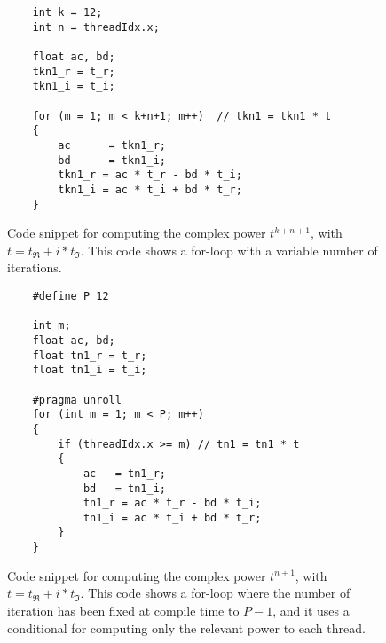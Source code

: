\medskip

\begin{figure*}\begin{center}
	\begin{lstlisting}
	int k = 12;
	int n = threadIdx.x;
	    
	float ac, bd;
	tkn1_r = t_r;
	tkn1_i = t_i;
	    
	for (m = 1; m < k+n+1; m++)  // tkn1 = tkn1 * t
	{
	    ac      = tkn1_r;
	    bd      = tkn1_i;
	    tkn1_r = ac * t_r - bd * t_i;
	    tkn1_i = ac * t_i + bd * t_r;
	}

	\end{lstlisting}
\caption{Code snippet for computing the complex power $t^{k+n+1}$, with $t = t_\Re + i * t_\Im$. This code shows a for-loop with a variable number of iterations.}
\label{code:loop_divergence}
\end{center}
\end{figure*}


\begin{figure*}\begin{center}
	\begin{lstlisting}
	#define P 12
	
	int m;
	float ac, bd;
	float tn1_r = t_r;
	float tn1_i = t_i;
	
	#pragma unroll
	for (int m = 1; m < P; m++)
	{
	    if (threadIdx.x >= m) // tn1 = tn1 * t
	    {
	        ac   = tn1_r;
	        bd   = tn1_i;
	        tn1_r = ac * t_r - bd * t_i;
	        tn1_i = ac * t_i + bd * t_r;
	    }
	}

	\end{lstlisting}
\caption{Code snippet for computing the complex power $t^{n+1}$, with $t = t_\Re + i * t_\Im$. This code shows a for-loop where the number of iteration has been fixed at compile time to $P-1$, and it uses a conditional for computing only the relevant power to each thread.}
\label{code:loop_known_num_iter}
\end{center}
\end{figure*}

